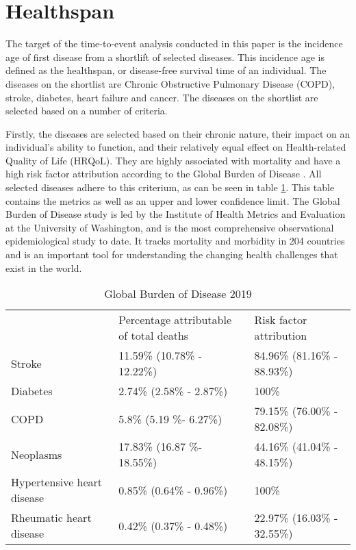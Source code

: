 \section{Healthspan}
\label{section:data:healthspan_target} %
The target of the time-to-event analysis conducted in this paper is the incidence age of first disease from a shortlift of selected diseases. This incidence age is defined as the healthspan, or disease-free survival time of an individual. The diseases on the shortlist are Chronic Obstructive Pulmonary Disease (COPD), stroke, diabetes, heart failure and cancer. The diseases on the shortlist are selected based on a number of criteria. 

Firstly, the diseases are selected based on their chronic nature, their impact on an individual's ability to function, and their relatively equal effect on Health-related Quality of Life (HRQoL).  They are highly associated with mortality and have a high risk factor attribution according to the Global Burden of Disease \citep{GBD}. All selected diseases adhere to this criterium, as can be seen in table \ref{table:data:global_burden_of_disease}. This table contains the metrics as well as an upper and lower confidence limit. The Global Burden of Disease study is led by the Institute of Health Metrics and Evaluation at the University of Washington, and is the most comprehensive observational epidemiological study to date. It tracks mortality and morbidity in 204 countries and is an important tool for understanding the changing health challenges that exist in the world.
\vspace{0.5cm}
\begin{table}[H]
    \centering
    \caption{Global Burden of Disease 2019}
    \begin{tabular}{lll}
    \cline{1-3}
             & Percentage attributable of total deaths & Risk factor attribution     \\ \cline{1-3}
    Stroke   & 11.59\% (10.78\% - 12.22\%)             & 84.96\% (81.16\% - 88.93\%) \\
    Diabetes & 2.74\% (2.58\% - 2.87\%)                & 100\%                       \\
    COPD     & 5.8\% (5.19 \%- 6.27\%)                 & 79.15\% (76.00\% - 82.08\%) \\
    Neoplasms     & 17.83\% (16.87 \%- 18.55\%)                 & 44.16\% (41.04\% - 48.15\%) \\
    Hypertensive heart disease & 0.85\% (0.64\% - 0.96\%)               & 100\%           \\
    Rheumatic heart disease & 0.42\% (0.37\% - 0.48\%) &  22.97\% (16.03\% - 32.55\%)
    \end{tabular}
    \label{table:data:global_burden_of_disease}
\end{table}
